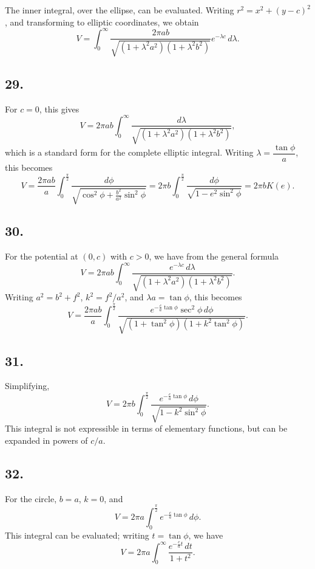 \documentclass[11pt,a4paper]{article}
\begin{document}
The inner integral, over the ellipse, can be evaluated. Writing
$r^2=x^2+(y-c)^2$, and transforming to elliptic coordinates, we obtain
\[
V = \int_0^{\infty} \frac{2\pi ab}{\sqrt{(1+\lambda^2a^2)(1+\lambda^2b^2)}}
    e^{-\lambda c}\,d\lambda.
\]

\newpage
\subsection*{29.}

For $c=0$, this gives
\[
V = 2\pi ab \int_0^{\infty}
    \frac{d\lambda}{\sqrt{(1+\lambda^2a^2)(1+\lambda^2b^2)}},
\]
which is a standard form for the complete elliptic integral. Writing
$\lambda=\dfrac{\tan\phi}{a}$, this becomes
\[
V = \frac{2\pi ab}{a} \int_0^{\frac{\pi}{2}}
    \frac{d\phi}{\sqrt{\cos^2\phi+\frac{b^2}{a^2}\sin^2\phi}}
  = 2\pi b \int_0^{\frac{\pi}{2}}
    \frac{d\phi}{\sqrt{1-e^2\sin^2\phi}}
  = 2\pi b K(e).
\]

\subsection*{30.}

For the potential at $(0,c)$ with $c>0$, we have from the general formula
\[
V = 2\pi ab \int_0^{\infty}
    \frac{e^{-\lambda c}\,d\lambda}
         {\sqrt{(1+\lambda^2a^2)(1+\lambda^2b^2)}}.
\]
Writing $a^2=b^2+f^2$, $k^2=f^2/a^2$, and $\lambda a=\tan\phi$, this
becomes
\[
V = \frac{2\pi ab}{a}
    \int_0^{\frac{\pi}{2}}
    \frac{e^{-\frac{c}{a}\tan\phi}\sec^2\phi\,d\phi}
         {\sqrt{(1+\tan^2\phi)(1+k^2\tan^2\phi)}}.
\]

\newpage
\subsection*{31.}

Simplifying,
\[
V = 2\pi b \int_0^{\frac{\pi}{2}}
    \frac{e^{-\frac{c}{a}\tan\phi}\,d\phi}
         {\sqrt{1-k^2\sin^2\phi}}.
\]
This integral is not expressible in terms of elementary functions, but can be
expanded in powers of $c/a$.

\subsection*{32.}

For the circle, $b=a$, $k=0$, and
\[
V = 2\pi a \int_0^{\frac{\pi}{2}}
    e^{-\frac{c}{a}\tan\phi}\,d\phi.
\]
This integral can be evaluated; writing $t=\tan\phi$, we have
\[
V = 2\pi a \int_0^{\infty} \frac{e^{-\frac{c}{a}t}\,dt}{1+t^2}.
\]
\end{document}
